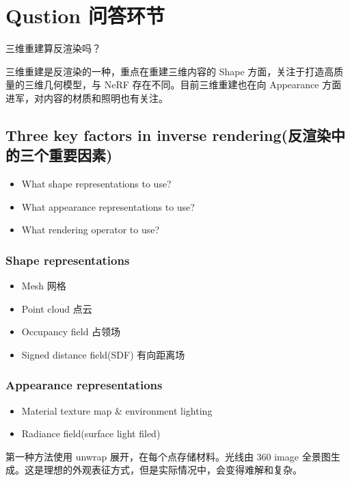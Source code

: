 \documentclass[cn,hazy,blue,14pt,screen]{elegantnote}
\begin{document}
\section*{Qustion 问答环节}

三维重建算反渲染吗？

三维重建是反渲染的一种，重点在重建三维内容的 Shape 方面，关注于打造高质量的三维几何模型，与 NeRF 存在不同。目前三维重建也在向 Appearance 方面进军，对内容的材质和照明也有关注。

\subsection{Three key factors in inverse rendering(反渲染中的三个重要因素)}

\begin{itemize}
\item What shape representations to use?
\item What appearance representations to use?
\item What rendering operator to use?
\end{itemize}

\subsubsection{Shape representations}

\begin{itemize}
\item Mesh 网格
\item Point cloud 点云
\item Occupancy field 占领场
\item Signed distance field(SDF) 有向距离场
\end{itemize}

\subsubsection{Appearance representations}

\begin{itemize}
\item Material texture map \& environment lighting
\item Radiance field(surface light filed\cite{wood2000surface})
\end{itemize}

第一种方法使用 unwrap 展开，在每个点存储材料。光线由 360 image 全景图生成。这是理想的外观表征方式，但是实际情况中，会变得难解和复杂。
\end{document}
